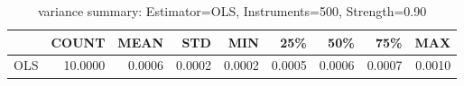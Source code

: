 \begin{table}[ht]
\centering
\caption{variance summary: Estimator=OLS, Instruments=500, Strength=0.90}
\begin{tabular}{lrrrrrrrr}
\toprule
 & COUNT & MEAN & STD & MIN & 25\% & 50\% & 75\% & MAX \\
\midrule
OLS & 10.0000 & 0.0006 & 0.0002 & 0.0002 & 0.0005 & 0.0006 & 0.0007 & 0.0010 \\
\bottomrule
\end{tabular}
\end{table}
